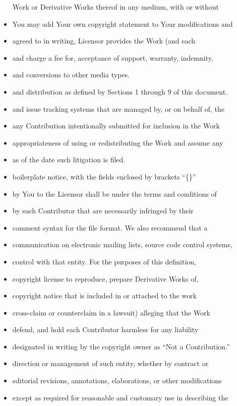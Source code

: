 \begin{itemize}
  Work or Derivative Works thereof in any medium, with or without
\item
  You may add Your own copyright statement to Your modifications and
\item
  agreed to in writing, Licensor provides the Work (and each
\item
  and charge a fee for, acceptance of support, warranty, indemnity,
\item
  and conversions to other media types.
\item
  and distribution as defined by Sections 1 through 9 of this document.
\item
  and issue tracking systems that are managed by, or on behalf of, the
\item
  any Contribution intentionally submitted for inclusion in the Work
\item
  appropriateness of using or redistributing the Work and assume any
\item
  as of the date such litigation is filed.
\item
  boilerplate notice, with the fields enclosed by brackets ``\{\}''
\item
  by You to the Licensor shall be under the terms and conditions of
\item
  by such Contributor that are necessarily infringed by their
\item
  comment syntax for the file format. We also recommend that a
\item
  communication on electronic mailing lists, source code control
  systems,
\item
  control with that entity. For the purposes of this definition,
\item
  copyright license to reproduce, prepare Derivative Works of,
\item
  copyright notice that is included in or attached to the work
\item
  cross-claim or counterclaim in a lawsuit) alleging that the Work
\item
  defend, and hold each Contributor harmless for any liability
\item
  designated in writing by the copyright owner as ``Not a
  Contribution.''
\item
  direction or management of such entity, whether by contract or
\item
  editorial revisions, annotations, elaborations, or other modifications
\item
  except as required for reasonable and customary use in describing the

\end{itemize}
